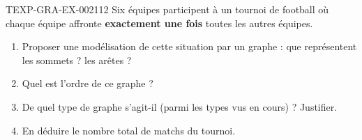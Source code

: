 \begin{exercice}{TEXP-GRA-EX-002}{1}{12}
Six équipes participent à un tournoi de football où chaque équipe affronte \textbf{exactement une fois} toutes les autres équipes.
\begin{enumerate}
  \item Proposer une modélisation de cette situation par un graphe : que représentent les sommets ? les arêtes ?
  \item Quel est l'ordre de ce graphe ?
  \item De quel type de graphe s'agit-il (parmi les types vus en cours) ? Justifier.
  \item En déduire le nombre total de matchs du tournoi.
\end{enumerate}
\end{exercice}
